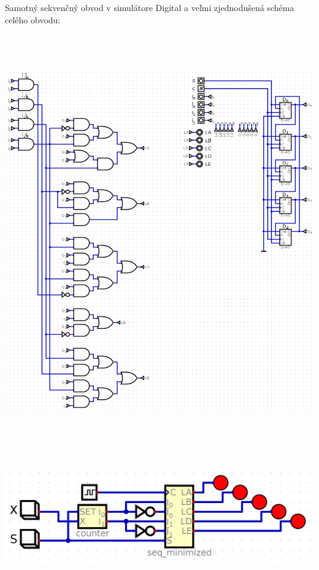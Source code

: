 \newpage
\noindent
Samotný sekvenčný obvod v simulátore Digital a veľmi zjednodušená schéma celého obvodu:\\
\begin{center}
    \includegraphics[width=16.2cm, height=17.8cm]{images/seq_dig.png}
\end{center}

\begin{center}
    \includegraphics[width=16.2cm, height=5.04cm]{images/scheme-dig.png}
\end{center}

